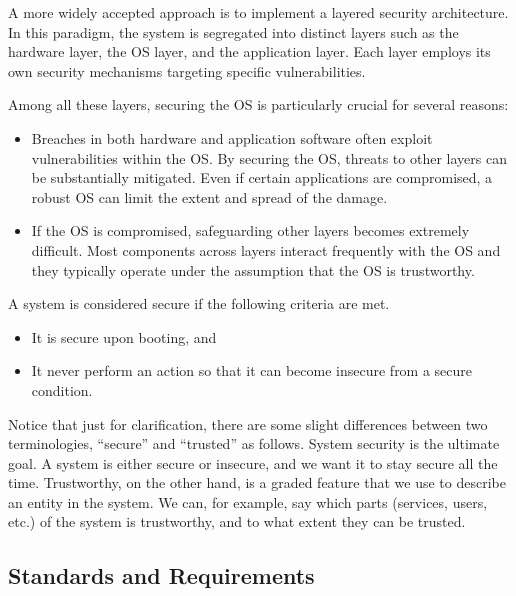 A more widely accepted approach is to implement a layered security architecture. In this paradigm, the system is segregated into distinct layers such as the hardware layer, the OS layer, and the application layer. Each layer employs its own security mechanisms targeting specific vulnerabilities.

Among all these layers, securing the OS is particularly crucial for several reasons:
\begin{itemize}
	\item Breaches in both hardware and application software often exploit vulnerabilities within the OS. By securing the OS, threats to other layers can be substantially mitigated. Even if certain applications are compromised, a robust OS can limit the extent and spread of the damage.
	\item If the OS is compromised, safeguarding other layers becomes extremely difficult. Most components across layers interact frequently with the OS and they typically operate under the assumption that the OS is trustworthy.
\end{itemize}

A system is considered secure if the following criteria are met.
\begin{itemize}
	\item It is secure upon booting, and
	\item It never perform an action so that it can become insecure from a secure condition.
\end{itemize}
Notice that just for clarification, there are some slight differences between two terminologies, ``secure'' and ``trusted'' as follows. System security is the ultimate goal. A system is either secure or insecure, and we want it to stay secure all the time. Trustworthy, on the other hand, is a graded feature that we use to describe an entity in the system. We can, for example, say which parts (services, users, etc.) of the system is trustworthy, and to what extent they can be trusted.

\subsection{Standards and Requirements}

